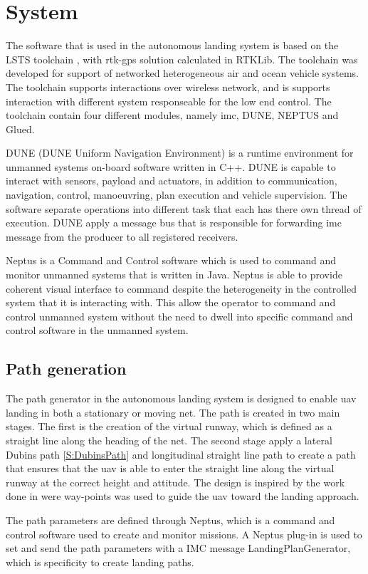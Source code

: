 \chapter{System}
The software that is used in the autonomous landing system is based on the LSTS toolchain \citep{pinto2013lsts}, with \gls{rtk-gps} solution calculated in RTKLib. The toolchain was developed for support of networked heterogeneous air and ocean vehicle systems. The toolchain supports interactions over wireless network, and is supports interaction with different system responseable for the low end control. The toolchain contain four different modules, namely \gls{imc}, DUNE, NEPTUS and Glued.

DUNE (DUNE Uniform Navigation Environment) is a runtime environment for unmanned systems on-board software written in C++. DUNE is capable to interact with sensors, payload and actuators, in addition to communication, navigation, control, manoeuvring, plan execution and vehicle supervision. The software separate operations into different task that each has there own thread of execution. DUNE apply a message bus that is responsible for forwarding \gls{imc} message from the producer to all registered receivers.

Neptus is a Command and Control software which is used to command and monitor unmanned systems that is written in Java. Neptus is able to provide coherent visual interface to command despite the heterogeneity in the controlled system that it is interacting with.  This allow the operator to command and control unmanned system without the need to dwell into specific command and control software in the unmanned system.
\section{Path generation}
The path generator in the  autonomous landing system is designed to enable \gls{uav} landing in both a stationary or moving net. The path is created in two main stages. The first is the creation of the virtual runway, which is defined as a straight line along the heading of the net. The second stage apply a lateral Dubins path \ref{S:DubinsPath} and longitudinal straight line path to create a path that ensures that the \gls{uav} is able to enter the straight line along the virtual runway at the correct height and attitude. The design is inspired by the work done in \citep{Skulstad&Syversen} were way-points was used to guide the \gls{uav} toward the landing approach.

The path parameters are defined through Neptus, which is a command and control software used to create and monitor missions. A Neptus plug-in is used to set and send the path parameters with a IMC message LandingPlanGenerator, which is specificity to create landing paths.

